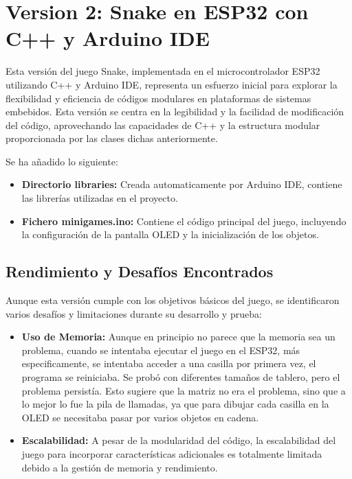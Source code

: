 \section{Version 2: Snake en ESP32 con C++ y Arduino IDE}

Esta versión del juego Snake, implementada en el microcontrolador ESP32 utilizando C++ y Arduino IDE, representa un esfuerzo inicial para explorar la flexibilidad y eficiencia de códigos modulares en plataformas de sistemas embebidos. Esta versión se centra en la legibilidad y la facilidad de modificación del código, aprovechando las capacidades de C++ y la estructura modular proporcionada por las clases dichas anteriormente.

Se ha añadido lo siguiente:

\begin{itemize}
  \item \textbf{Directorio libraries:} Creada automaticamente por Arduino IDE, contiene las librerías utilizadas en el proyecto.
  \item \textbf{Fichero minigames.ino:} Contiene el código principal del juego, incluyendo la configuración de la pantalla OLED y la inicialización de los objetos.
\end{itemize}

\subsection{Rendimiento y Desafíos Encontrados}

Aunque esta versión cumple con los objetivos básicos del juego, se identificaron varios desafíos y limitaciones durante su desarrollo y prueba:

\begin{itemize}
    \item \textbf{Uso de Memoria:} Aunque en principio no parece que la memoria sea un problema, cuando se intentaba ejecutar el juego en el ESP32, más especificamente, se intentaba acceder a una casilla por primera vez, el programa se reiniciaba. Se probó con diferentes tamaños de tablero, pero el problema persistía. Esto sugiere que la matriz no era el problema, sino que a lo mejor lo fue la pila de llamadas, ya que para dibujar cada casilla en la OLED se necesitaba pasar por varios objetos en cadena.
    \item \textbf{Escalabilidad:} A pesar de la modularidad del código, la escalabilidad del juego para incorporar características adicionales es totalmente limitada debido a la gestión de memoria y rendimiento.
\end{itemize}



